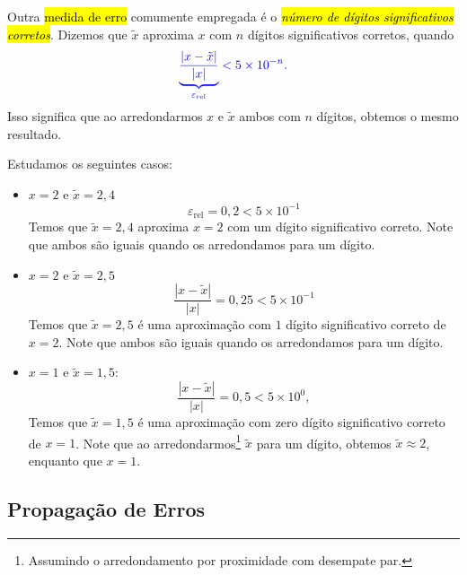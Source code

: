 Outra \hl{medida de erro} comumente empregada é o \hl{\emph{número de dígitos significativos corretos}}. Dizemos que $\tilde{x}$ aproxima $x$ com $n$ dígitos significativos corretos, quando
\begin{equation}
  \color{blue}\underbrace{\frac{|x - \tilde{x}|}{|x|}}_{\varepsilon_{\text{rel}}} < 5\times 10^{-n}.
\end{equation}
Isso significa que ao arredondarmos $x$ e $\tilde{x}$ ambos com $n$ dígitos, obtemos o mesmo resultado.

\begin{ex}\label{ex:numdigsigcorr}
  Estudamos os seguintes casos:
  \begin{itemize}
  \item $x=2$ e $\tilde{x} = 2,4$
    \begin{equation}
      \varepsilon_{\text{rel}} = 0,2 < 5\times 10^{-1}
    \end{equation}
    Temos que $\tilde{x} = 2,4$ aproxima $x = 2$ com um dígito significativo correto. Note que ambos são iguais quando os arredondamos para um dígito.
  \item $x=2$ e $\tilde{x} = 2,5$
    \begin{equation}
      \frac{|x - \tilde{x}|}{|x|} = 0,25 < 5\times 10^{-1}
    \end{equation}
    Temos que $\tilde{x}=2,5$ é uma aproximação com $1$ dígito significativo correto de $x=2$. Note que ambos são iguais quando os arredondamos para um dígito.
  \item $x=1$ e $\tilde{x} = 1,5$:
    \begin{equation}
      \frac{|x - \tilde{x}|}{|x|} = 0,5 < 5\times 10^{0},
    \end{equation}
    Temos que $\tilde{x}=1,5$ é uma aproximação com zero dígito significativo correto de $x=1$. Note que ao arredondarmos\footnote{Assumindo o arredondamento por proximidade com desempate par.} $\tilde{x}$ para um dígito, obtemos $\tilde{x}\approx 2$, enquanto que $x=1$.
  \end{itemize}
\end{ex}

\subsection{Propagação de Erros}

